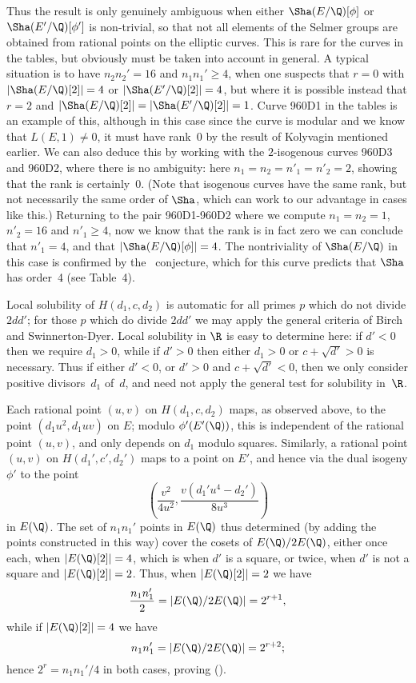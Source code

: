 Thus the result is only genuinely ambiguous when either
$\Sha(E/\Q)[\phi]$ or $\Sha(E'/\Q)[\phi']$ is non-trivial, so that not
all elements of the Selmer groups are obtained from rational points on
the elliptic curves.  This is rare for the curves in the tables, but
obviously must be taken into account in general.  A typical situation
is to have $n_2n_2'=16$ and $n_1n_1'\ge4$, when one suspects that
$r=0$ with $\left|\Sha(E/\Q)[2]\right|=4$ or
$\left|\Sha(E'/\Q)[2]\right|=4$, but where it is possible instead that
$r=2$ and $\left|\Sha(E/\Q)[2]\right|=\left|\Sha(E'/\Q)[2]\right|=1$.
Curve 960D1 in the tables is an example of this, although in this case
since the curve is modular and we know that $L(E,1)\not=0$, it must
have rank~0 by the result of Kolyvagin mentioned earlier.  We can also
deduce this by working with the $2$-isogenous curves 960D3 and 960D2,
where there is no ambiguity: here $n_1=n_2=n'_1=n'_2=2$, showing that
the rank is certainly~0.  (Note that isogenous curves have the same
rank, but not necessarily the same order of $\Sha$, which can work to
our advantage in cases like this.)  Returning to the pair 960D1-960D2
where we compute $n_1=n_2=1$, $n'_2=16$ and $n'_1\ge4$, now we know
that the rank is in fact zero we can conclude that $n'_1=4$, and that
$\left|\Sha(E/\Q)[\phi]\right|=4$.  The nontriviality of $\Sha(E/\Q)$
in this case is confirmed by the \BSD\ conjecture, which for this
curve predicts that $\Sha$ has order~4 (see Table~4).

Local solubility of $H(d_1,c,d_2)$ is automatic for all primes $p$
which do not divide $2dd'$; for those $p$ which do divide $2dd'$ we
may apply the general criteria of Birch and Swinnerton-Dyer. Local
solubility in $\R$ is easy to determine here: if $d'<0$ then we
require $d_1>0$, while if $d'>0$ then either $d_1>0$ or
$c+\sqrt{d'}>0$ is necessary.  Thus if either $d'<0$, or $d'>0$ and
$c+\sqrt{d'}<0$, then we only consider positive divisors~$d_1$ of~$d$,
and need not apply the general test for solubility in~$\R$.

Each rational point $(u,v)$ on $H(d_1,c,d_2)$ maps, as observed above,
to the point $(d_1u^2,d_1uv)$ on $E$; modulo $\phi'(E'(\Q))$, this is
independent of the rational point $(u,v)$, and only depends on $d_1$
modulo squares.  Similarly, a rational point $(u,v)$ on
$H(d_1',c',d_2')$ maps to a point on $E'$, and hence via the dual
isogeny $\phi'$ to the point
$$
  \left(\frac{v^2}{4u^2} , \frac{v(d_1'u^4-d_2')}{8u^3}\right)
$$
in $E(\Q)$.  The set of $n_1n_1'$ points in $E(\Q)$ thus determined
(by adding the points constructed in this way) cover the cosets of
$E(\Q)/2E(\Q)$, either once each, when $|E(\Q)[2]|=4$, which is when
$d'$ is a square, or twice, when $d'$ is not a square and
$|E(\Q)[2]|=2$.  Thus, when $|E(\Q)[2]|=2$ we have
$$ 
  \frac{n_1n_1'}{2} = |E(\Q)/2E(\Q)| = 2^{r+1},
$$
while if $|E(\Q)[2]|=4$ we have
$$
   n_1n_1' = |E(\Q)/2E(\Q)| = 2^{r+2};
$$
hence $2^r=n_1n_1'/4$ in both cases, proving (\rankeqn).

